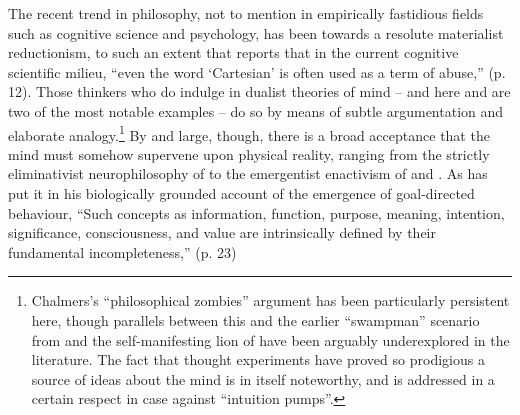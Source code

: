The recent trend in philosophy, not to mention in empirically fastidious fields such as cognitive science and psychology, has been towards a resolute materialist reductionism, to such an extent that \cite{Rowlands} reports that in the current cognitive scientific milieu, ``even the word `Cartesian' is often used as a term of abuse,'' (p. 12).  Those thinkers who do indulge in dualist theories of mind -- and here \cite{Chalmers1996} and \cite{Fodor2008} are two of the most notable examples -- do so by means of subtle argumentation and elaborate analogy.\footnote{Chalmers's ``philosophical zombies'' argument has been particularly persistent here, though parallels between this and the earlier ``swampman'' scenario from \cite{Davidson} and the self-manifesting lion of \cite{Millikan} have been arguably underexplored in the literature.  The fact that thought experiments have proved so prodigious a source of ideas about the mind is in itself noteworthy, and is addressed in a certain respect in  case against ``intuition pumps''.}  By and large, though, there is a broad acceptance that the mind must somehow supervene upon physical reality, ranging from the strictly eliminativist neurophilosophy of \cite{Churchland} to the emergentist enactivism of \cite{Thompson} and \cite{Hutto}.  As \cite{Deacon} has put it in his biologically grounded account of the emergence of goal-directed behaviour, ``Such concepts as information, function, purpose, meaning, intention, significance, consciousness, and value are intrinsically defined by their fundamental incompleteness,'' (p. 23)



